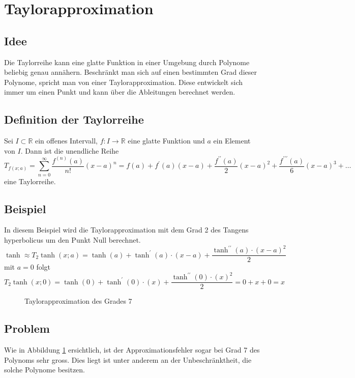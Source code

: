 %
%
%
\section{Taylorapproximation
\label{transfer:section:teil1}}
\subsection{Idee}
Die Taylorreihe kann eine glatte Funktion in einer Umgebung durch Polynome beliebig genau annähern. Beschränkt man sich auf einen bestimmten Grad dieser Polynome, spricht man von einer Taylorapproximation. Diese entwickelt sich immer um einen Punkt und kann über die Ableitungen berechnet werden.

\subsection{Definition der Taylorreihe}
Sei $I \subset \mathbb{R}$ ein offenes Intervall, $f: I \rightarrow \mathbb{R}$ eine glatte Funktion und $a$ ein Element von $I$. Dann ist die unendliche Reihe
\begin{equation}
	T_{f(x ; a)}=\sum_{n=0}^{\infty} \frac{f^{(n)}(a)}{n !}(x-a)^{n}=f(a)+f^{\prime}(a)(x-a)+\frac{f^{\prime \prime}(a)}{2}(x-a)^{2}+\frac{f^{\prime \prime \prime}(a)}{6}(x-a)^{3}+\ldots
\end{equation}
eine Taylorreihe.

\subsection{Beispiel}
In diesem Beispiel wird die Taylorapproximation mit dem Grad 2 des Tangens hyperbolicus um den Punkt Null berechnet.
$$
	\tanh \approx T_{2} \tanh(x ; a)=\tanh(a)+\tanh^{\prime}(a) \cdot(x-a)+\frac{\tanh^{\prime \prime}(a) \cdot(x-a)^{2}}{2}
$$
mit $a = 0$ folgt
$$
	T_{2} \tanh(x ; 0)=\tanh(0)+\tanh^{\prime}(0) \cdot(x)+\frac{\tanh^{\prime \prime}(0) \cdot(x)^{2}}{2} = 0 + x + 0 = x
$$

\begin{figure}
\centering
{}
\caption{Taylorapproximation des Grades 7
\label{motivation:figure:Taylor}}
\end{figure}

\subsection{Problem}
Wie in Abbildung \ref{motivation:figure:Taylor} ersichtlich, ist der Approximationsfehler sogar bei Grad 7 des Polynoms sehr gross. Dies liegt ist unter anderem an der Unbeschränktheit, die solche Polynome besitzen. 
